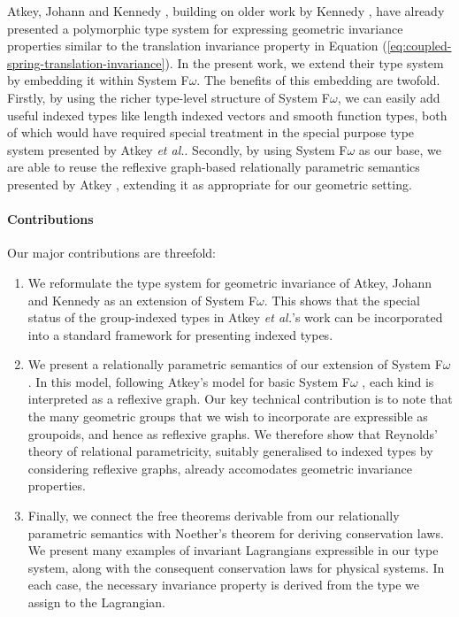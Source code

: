 \documentclass[preprint]{sigplanconf}
\theoremstyle{examplestyle}
\begin{document}
Atkey, Johann and Kennedy \cite{atkey13abstraction}, building on older
work by Kennedy \cite{kennedy94para}, have already presented a
polymorphic type system for expressing geometric invariance properties
similar to the translation invariance property in Equation
(\ref{eq:coupled-spring-translation-invariance}). In the present work,
we extend their type system by embedding it within System
F$\omega$. The benefits of this embedding are twofold. Firstly, by
using the richer type-level structure of System F$\omega$, we can
easily add useful indexed types like length indexed vectors and smooth
function types, both of which would have required special treatment in
the special purpose type system presented by Atkey \emph{et
  al.}. Secondly, by using System F$\omega$ as our base, we are able
to reuse the reflexive graph-based relationally parametric semantics
presented by Atkey \cite{atkey12relational}, extending it as
appropriate for our geometric setting.

\paragraph{Contributions}

Our major contributions are threefold:
\begin{enumerate}
\item We reformulate the type system for geometric invariance of
  Atkey, Johann and Kennedy \cite{atkey13abstraction} as an extension
  of System F$\omega$. This shows that the special status of the
  group-indexed types in Atkey \emph{et al.}'s work can be
  incorporated into a standard framework for presenting indexed types.
\item We present a relationally parametric semantics of our extension
  of System F$\omega$. In this model, following Atkey's model for
  basic System F$\omega$ \cite{atkey12relational}, each kind is
  interpreted as a reflexive graph. Our key technical contribution is
  to note that the many geometric groups that we wish to incorporate
  are expressible as groupoids, and hence as reflexive graphs. We
  therefore show that Reynolds' theory of relational parametricity,
  suitably generalised to indexed types by considering reflexive
  graphs, already accomodates geometric invariance properties.
\item Finally, we connect the free theorems derivable from our
  relationally parametric semantics with Noether's theorem for
  deriving conservation laws. We present many examples of invariant
  Lagrangians expressible in our type system, along with the
  consequent conservation laws for physical systems. In each case, the
  necessary invariance property is derived from the type we assign to
  the Lagrangian.
\end{enumerate}
\end{document}

